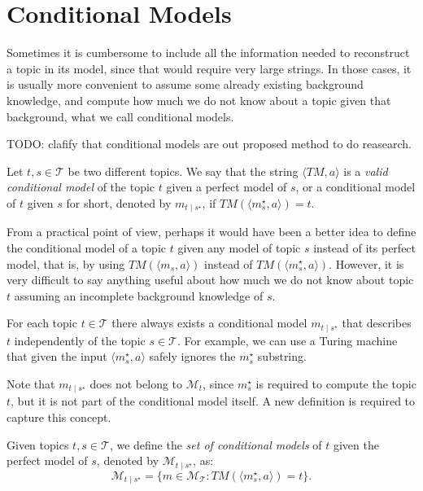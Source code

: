 %
%

\section{Conditional Models}

Sometimes it is cumbersome to include all the information needed to reconstruct a topic in its model, since that would require very large strings. In those cases, it is usually more convenient to assume some already existing background knowledge, and compute how much we do not know about a topic given that background, what we call conditional models.

{\color{red} TODO: clafify that conditional models are out proposed method to do reasearch.}

\begin{definition}
Let $t,s \in \mathcal{T}$ be two different topics. We say that the string $\langle TM,a \rangle$ is a \emph{valid conditional model} of the topic $t$ given a perfect model of $s$, or a conditional model of $t$ given $s$ for short, denoted by $m_{t \mid s^\star}$, if $TM \left(\langle m_s^\star, a \rangle \right) = t$.
\end{definition}

From a practical point of view, perhaps it would have been a better idea to define the conditional model of a topic $t$ given any model of topic $s$ instead of its perfect model, that is, by using $TM \left( \langle m_s, a \rangle \right)$ instead of $TM \left( \langle m_s^\star, a \rangle \right)$. However, it is very difficult to say anything useful about how much we do not know about topic $t$ assuming an incomplete background knowledge of $s$.

\begin{example}
For each topic $t \in \mathcal{T}$ there always exists a conditional model $m_{t \mid s^\star}$ that describes $t$ independently of the topic $s \in \mathcal{T}$. For example, we can use a Turing machine that given the input $\langle m_s^\star, a \rangle$ safely ignores the $m_s^\star$ substring.
\end{example}

Note that $m_{t \mid s^\star}$ does not belong to $\mathcal{M}_t$, since $m_s^\star$ is required to compute the topic $t$, but it is not part of the conditional model itself. A new definition is required to capture this concept.

\begin{definition}
Given topics $t,s \in \mathcal{T}$, we define the \emph{set of conditional models} of $t$ given the perfect model of $s$, denoted by $\mathcal{M}_{t \mid s^\star}$, as:
\[
\mathcal{M}_{t \mid s^\star} = \{ m \in \mathcal{M}_{\mathcal{T}} : TM \left(\langle m_s^\star, a \rangle \right) = t \}.
\]
\end{definition}

